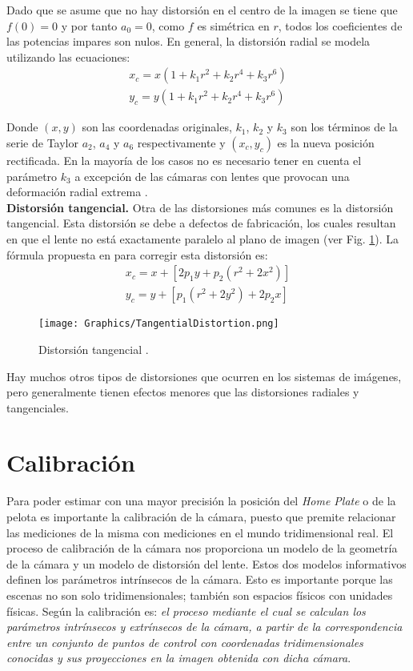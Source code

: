 Dado que se asume que no hay distorsión en el centro de la imagen se tiene que $f(0)=0$ y por tanto $a_0=0$, como $f$ es simétrica en $r$, todos los coeficientes de las potencias impares son nulos. En general, la distorsión radial se modela utilizando las ecuaciones:
\begin{gather*}
    x_c = x(1 + k_1 r^2 + k_2 r^4 + k_3 r^6)\\
    y_c = y(1 + k_1 r^2 + k_2 r^4 + k_3 r^6)
\end{gather*}

Donde $(x, y)$ son las coordenadas originales, $k_1$, $k_2$ y $k_3$ son los términos de la serie de Taylor $a_2$, $a_4$ y $a_6$ respectivamente y $(x_c, y_c)$ es la nueva posición rectificada. En la mayoría de los casos no es necesario tener en cuenta el parámetro $k_3$ a excepción de las cámaras con lentes que provocan una deformación radial extrema \cite{DVD}.\\

\textbf{Distorsión tangencial.}
Otra de las distorsiones más comunes es la distorsión tangencial. Esta distorsión se debe a defectos de fabricación, los cuales resultan en que el lente no está exactamente paralelo al plano de imagen (ver Fig. \ref{fig:TangentialDistortion}). La fórmula propuesta en \cite{GaryAdrian} para corregir esta distorsión es:
\begin{gather*}
    x_c = x + [2p_1y + p_2(r^2 + 2x^2)]\\
    y_c = y + [p_1(r^2 + 2y^2) + 2p_2x]
\end{gather*}

\begin{figure}[h!]
	\centering
	\texttt{[image: Graphics/TangentialDistortion.png]}
	\caption{Distorsión tangencial \cite{DVD}.}
	\label{fig:TangentialDistortion}
\end{figure}

Hay muchos otros tipos de distorsiones que ocurren en los sistemas de imágenes, pero generalmente tienen efectos menores que las distorsiones radiales y tangenciales.

\section{Calibración}

Para poder estimar con una mayor precisión la posición del \textit{Home Plate} o de la pelota es importante la calibración de la cámara, puesto que premite relacionar las mediciones de la misma con mediciones en el mundo tridimensional real. El proceso de calibración de la cámara nos proporciona un modelo de la geometría de la cámara y un modelo de distorsión del lente. Estos dos modelos informativos definen los parámetros intrínsecos de la cámara. Esto es importante porque las escenas no son solo tridimensionales; también son espacios físicos con unidades físicas. Según \cite{GaryAdrian} la calibración es: \textit{el proceso mediante el cual se calculan los parámetros intrínsecos y extrínsecos de la cámara, a partir de la correspondencia entre un conjunto de puntos de control con coordenadas tridimensionales conocidas y sus proyecciones en la imagen obtenida con dicha cámara}.

